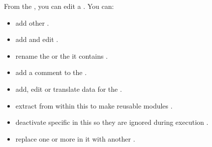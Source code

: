 
From the \gdtestcaseeditor{}, you can edit a \gdcase{}. You can:

\begin{itemize}
\item add other \gdcases{} .
\item add and edit \gdsteps{} .
\item rename the \gdcase{}  or the \gdcases{} it contains .
\item add a comment to the \gdcase{} .
\item add, edit or translate data for the \gdcase{} .
\item extract \gdcases{} from within this \gdcase{} to make reusable modules .
\item deactivate specific \gdcases{} in this \gdcase{} so they are ignored during execution .
\item replace one or more \gdcases{} in it with another \gdcase{} .
\end{itemize}



